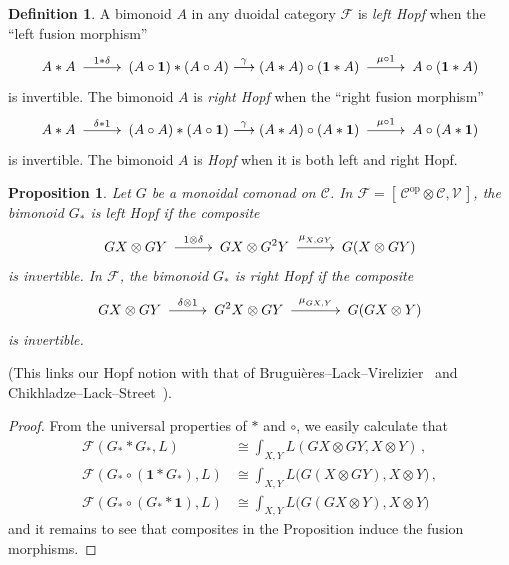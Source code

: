 \documentclass[a4paper,12pt]{article}
\makeatletter
\newtheorem*{Proposition}{Proposition}
\theoremstyle{definition}
\newtheorem*{Definition}{Definition}%
\theoremstyle{fact}
\theoremstyle{genquest}
\theoremstyle{step}
\newcommand{\catI}{\mathbf{1}}
\newcommand{\catC}{\mathcal{C}}
\newcommand{\catF}{\mathcal{F}}
\newcommand{\catV}{\mathcal{V}}
\newcommand{\op}{\operatorname{op}}
\newcommand{\longto}{\longrightarrow}
\newcommand{\xylongto}[2][2pt]{{\UseTips{}\xymatrix @C+#1{ \ar[r]^{#2}&}}}
\makeatother
\begin{document}
\begin{Definition} 
A bimonoid $A$ in any duoidal category $\catF$ is \emph{left Hopf} when the ``left fusion morphism''
\[
A \ast A \xylongto{1 \ast \delta} %
 (A \circ \catI) \ast (A \circ A) 
 \stackrel{\gamma}{\longto} (A\ast A) \circ (\catI \ast A) \xylongto{\mu \circ 1} %
  A \circ (\catI \ast A)
\]
is invertible.   
The bimonoid $A$ is \emph{right Hopf} when the ``right fusion morphism''
\[
A \ast A \xylongto{\delta \ast 1} %
 (A \circ A) \ast (A \circ \catI) \stackrel{\gamma}{\longto}
  (A \ast A) \circ (A \ast \catI) \xylongto{\mu \circ 1} %
  A \circ (A \ast \catI)
\]
is invertible. The bimonoid $A$ is \emph{Hopf} when it is both left and right Hopf.
\end{Definition} 

\begin{Proposition} 
Let $G$ be a monoidal comonad on $\catC$. 
In $\catF = [\,\catC^{\op} \otimes \catC,\catV\,]$, the bimonoid $G_\ast$ 
is left Hopf if the composite
\[
GX \otimes GY \xylongto{1 \otimes \delta} %
GX \otimes G^2 Y \xylongto{\mu^{}_{X,GY}} %
G (X \otimes GY)
\]
is invertible.   
In $\catF$, the bimonoid $G_\ast$ is right Hopf if the composite
\[
GX \otimes GY \xylongto{\delta \otimes 1} %
G^2 X \otimes GY \xylongto[10pt]{\mu^{}_{GX,Y}} %
G (GX \otimes Y)
\]
is invertible.
\end{Proposition} 

\noindent
(This links our Hopf notion with that of Brugui\`eres--Lack--Virelizier~\cite{BrugVirelLack} 
and Chikhl\-adze--Lack--Street~\cite{ChLaSt}).

\begin{proof} 
From the universal properties of $\ast$ and $\circ$, we easily calculate that
\begin{align*}
\catF (G_\ast \ast G_\ast,L) &\cong \int_{X,Y} L(GX \otimes GY, X \otimes Y)\,,
\\
\catF (G_\ast \circ (\catI \ast G_\ast),L) &\cong \int_{X,Y} L\bigl(G(X \otimes GY), X \otimes Y\bigr)\,,
\\
\catF (G_\ast \circ (G_\ast \ast \catI),L) &\cong \int_{X,Y} L\bigl(G(GX \otimes Y), X \otimes Y\bigr)
\end{align*}
and it remains to see that composites in the Proposition induce the fusion morphisms. 
\end{proof} 
\end{document}
